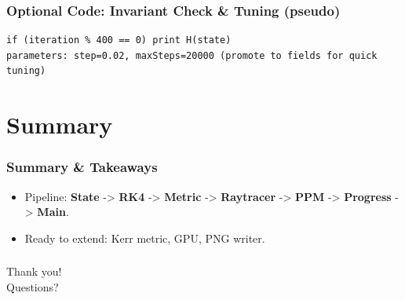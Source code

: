 \documentclass[aspectratio=169]{beamer}
\newcommand{\ProgressStep}[1]{\progressstep{#1}}
\newcommand{\ThisFrameTitle}[1]{\frametitle{#1}}
\begin{document}
\begin{frame}[fragile]
  \ProgressStep{-1}\ThisFrameTitle{Optional Code: Invariant Check \& Tuning (pseudo)}
\begin{verbatim}
if (iteration % 400 == 0) print H(state)
parameters: step=0.02, maxSteps=20000 (promote to fields for quick tuning)
\end{verbatim}
\end{frame}

\section{Summary}
\begin{frame}
  \ProgressStep{-1}\ThisFrameTitle{Summary \& Takeaways}
  \begin{itemize}
    \item Pipeline: \textbf{State} -> \textbf{RK4} -> \textbf{Metric} -> \textbf{Raytracer} -> \textbf{PPM} -> \textbf{Progress} -> \textbf{Main}.
    \item Ready to extend: Kerr metric, GPU, PNG writer.
  \end{itemize}
\end{frame}

\begin{frame}
  \ProgressStep{-1}\ThisFrameTitle{}
  \begin{center}
    \LARGE Thank you!\\[2mm]
    \large Questions?
  \end{center}
\end{frame}
\end{document}
